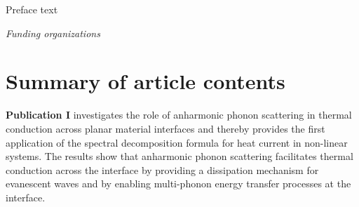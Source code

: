 \documentclass[dissertation,draft*]{aaltoseries}
\begin{document}



\author{Kimmo S\"a\"askilahti}
\begin{preface}
Preface text
\end{preface}

\vspace{1cm}
\noindent
\textit{Funding organizations}

\tableofcontents

\listofpublications

\chapter*{Summary of article contents}

\textbf{Publication I} investigates the role of anharmonic phonon scattering in thermal conduction across planar material interfaces and thereby provides the first application of the spectral decomposition formula for heat current in non-linear systems. The results show that anharmonic phonon scattering facilitates thermal conduction across the interface by providing a dissipation mechanism for evanescent waves and by enabling multi-phonon energy transfer processes at the interface.
\end{document}
